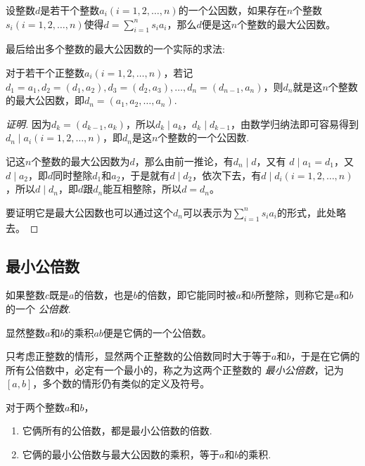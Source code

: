 \begin{theorem}
  设整数$d$是若干个整数$a_i(i=1,2,\ldots,n)$的一个公因数，如果存在$n$个整数$s_i(i=1,2,\ldots,n)$使得$d=\sum_{i=1}^n s_ia_i$，那么$d$便是这$n$个整数的最大公因数。
\end{theorem}

最后给出多个整数的最大公因数的一个实际的求法:
\begin{theorem}
  对于若干个正整数$a_i(i=1,2,\ldots,n)$，若记$d_1=a_1, d_2=(d_1,a_2), d_3=(d_2, a_3),\ldots,d_n=(d_{n-1},a_n)$，则$d_n$就是这$n$个整数的最大公因数，即$d_n=(a_1,a_2,\ldots,a_n)$.
\end{theorem}

\begin{proof}[证明]
  因为$d_k=(d_{k-1},a_k)$，所以$d_k \mid a_k$，$d_k \mid d_{k-1}$，由数学归纳法即可容易得到$d_n \mid a_i(i=1,2,\dots,n)$，即$d_n$是这$n$个整数的一个公因数.

  记这$n$个整数的最大公因数为$d$，那么由前一推论，有$d_n \mid d$，又有 $d \mid a_1=d_1$，又$d \mid a_2$，即$d$同时整除$d_1$和$a_2$，于是就有$d \mid d_2$，依次下去，有$d \mid d_i(i=1,2,\ldots,n)$，所以$d \mid d_n$，即$d$跟$d_n$能互相整除，所以$d=d_n$。

  要证明它是最大公因数也可以通过这个$d_n$可以表示为$\sum_{i=1}^n s_ia_i$的形式，此处略去。
\end{proof}

\subsection{最小公倍数}
\label{sec:least-common-multiple}

\begin{definition}
  如果整数$c$既是$a$的倍数，也是$b$的倍数，即它能同时被$a$和$b$所整除，则称它是$a$和$b$的一个 \emph{公倍数}.
\end{definition}
显然整数$a$和$b$的乘积$ab$便是它俩的一个公倍数。

只考虑正整数的情形，显然两个正整数的公倍数同时大于等于$a$和$b$，于是在它俩的所有公倍数中，必定有一个最小的，称之为这两个正整数的 \emph{最小公倍数}，记为$[a,b]$，多个数的情形仍有类似的定义及符号。

\begin{theorem}
  对于两个整数$a$和$b$，
  \begin{enumerate}
  \item 它俩所有的公倍数，都是最小公倍数的倍数.
  \item 它俩的最小公倍数与最大公因数的乘积，等于$a$和$b$的乘积.
  \end{enumerate}
\end{theorem}

